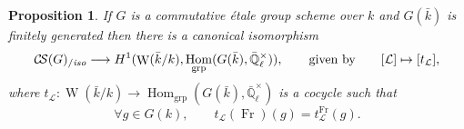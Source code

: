 \documentclass[11pt]{amsart}
\theoremstyle{plain}
\newtheorem{proposition}[theorem]{Proposition}
\theoremstyle{definition}
\theoremstyle{remark}
\newcommand{\EE}{\mathbb{\bar Q}_\ell}
\newcommand{\bFq}{\bar{k}}
\newcommand{\Fq}{k}
\DeclareMathOperator{\Weil}{W}
\newcommand{\Frob}{{\operatorname{Fr}}}
\DeclareMathOperator{\Hom}{Hom}
\newcommand{\cs}[1]{{\mathcal{#1}}}
\newcommand{\CS}{{\mathcal{C\hskip-1.8pt S}}}
\newcommand{\CSiso}[1]{\CS(#1)_{/\textit{iso}}}
\begin{document}
%

\begin{proposition}\label{prop:etale}
  If $G$ is a commutative \'etale group scheme over $\Fq$ and
  $G(\bFq)$ is finitely generated then there is a canonical
  isomorphism
  \[
  \CSiso{G} \longrightarrow H^1(\Weil(\bFq/\Fq), \Hom_\text{grp}(G(\bFq),\EE^\times)),
  \qquad \text{given by}\qquad
  [\cs{L}] \mapsto [t_\cs{L}],
  \]
  where $t_\cs{L}: \Weil(\bFq/\Fq)\to \Hom_\text{grp}(G(\bFq),\EE^\times)$ is a cocycle such that
  \[
  \forall g\in G(\Fq), \qquad t_\cs{L}(\Frob)(g) = t^\Frob_\cs{L}(g).
  \]
\end{proposition}
\end{document}

